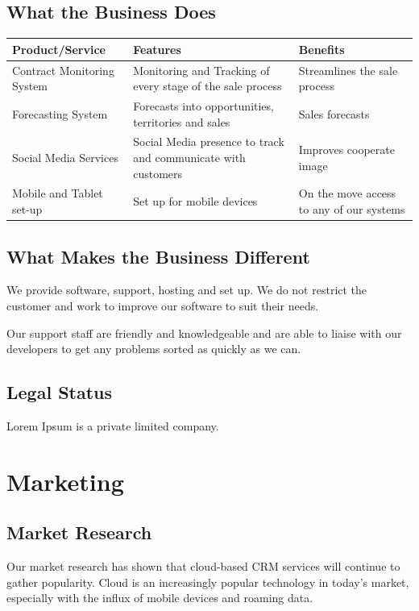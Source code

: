 \documentclass[DIV=calc, paper=a4, fontsize=11pt]{scrartcl}	 %
\begin{document}
\subsection{What the Business Does}
\begin{tabular}{|l|p{}|p{}|}\hline
Product/Service & Features & Benefits \\ \hline
Contract Monitoring System & Monitoring and Tracking of every stage of the sale process & Streamlines the sale process \\ \hline
Forecasting System & Forecasts into opportunities, territories and sales & Sales forecasts \\ \hline
Social Media Services & Social Media presence to track and communicate with customers & Improves cooperate image \\ \hline
Mobile and Tablet set-up & Set up for mobile devices & On the move access to any of our systems \\ \hline
\end{tabular}


\subsection{What Makes the Business Different}
We provide software, support, hosting and set up. We do not restrict the customer and work to 
improve our software to suit their needs.

Our support staff are friendly and knowledgeable and are able to liaise with our developers to get
any problems sorted as quickly as we can.


\subsection{Legal Status}
Lorem Ipsum is a private limited company.

\section{Marketing}

\subsection{Market Research}
Our market research has shown that cloud-based CRM services will continue to gather popularity.
Cloud is an increasingly popular technology in today's market, especially with the influx of
mobile devices and roaming data.
\end{document}
